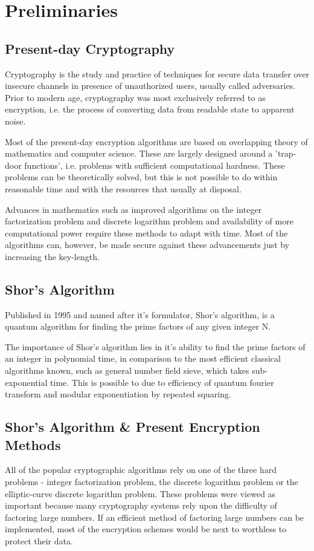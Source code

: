 \chapter{Preliminaries}
\label{chap:prelim}

\section{Present-day Cryptography}
Cryptography is the  study and practice of techniques for secure data transfer over insecure channels in presence of unauthorized users, usually called adversaries. Prior to modern age, cryptography was most exclusively referred to as encryption, i.e. the process of converting data from readable state to apparent noise.

Most of the present-day encryption algorithms are based on overlapping theory of mathematics and computer science. These are largely designed around a 'trap-door functions', i.e. problems with sufficient computational hardness. These problems can be theoretically solved, but this is not possible to do within reasonable time and with the resources that usually at disposal.

Advances in mathematics such as improved algorithms on the integer factorization problem and discrete logarithm problem and availability of more computational power require these methods to adapt with time. Most of the algorithms can, however, be made secure against these advancements just by increasing the key-length.

\section{Shor's Algorithm}
Published in 1995 and named after it's formulator, Shor's algorithm, is a quantum algorithm for finding the prime factors of any given integer N.

The importance of Shor's algorithm lies in it's ability to find the prime factors of an integer in polynomial time, in comparison to the most efficient classical algorithms known, such as general number field sieve, which takes sub-exponential time. This is possible to due to efficiency of quantum fourier transform and modular exponentiation by repeated squaring.

\section{Shor's Algorithm \& Present Encryption Methods}
All of the popular cryptographic algorithms rely on one of the three hard problems - integer factorization problem, the discrete logarithm problem or the elliptic-curve discrete logarithm problem. These problems were viewed as important because many cryptography systems rely upon the difficulty of factoring large numbers. If an efficient method of factoring large numbers can be implemented, most of the encryption schemes would be next to worthless to protect their data. 

